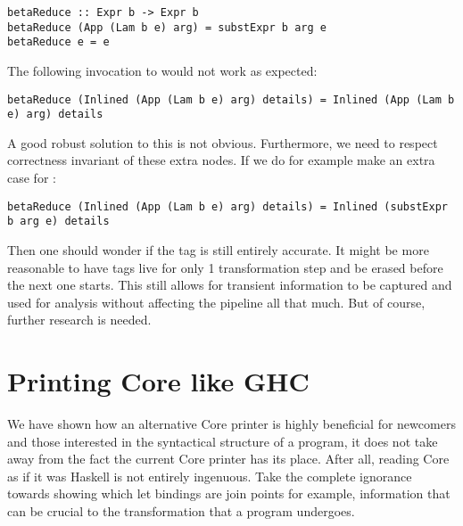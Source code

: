 \begin{listing}[H]
\begin{verbatim}
betaReduce :: Expr b -> Expr b
betaReduce (App (Lam b e) arg) = substExpr b arg e
betaReduce e = e
\end{verbatim}
\end{listing}

The following invocation to  would not work as expected:

\begin{listing}[H]
\begin{verbatim}
betaReduce (Inlined (App (Lam b e) arg) details) = Inlined (App (Lam b e) arg) details
\end{verbatim}
\end{listing}

A good robust solution to this is not obvious. Furthermore, we need to respect correctness invariant of these extra nodes. If we do for example make
an extra case for :

\begin{listing}[H]
\begin{verbatim}
betaReduce (Inlined (App (Lam b e) arg) details) = Inlined (substExpr b arg e) details
\end{verbatim}
\end{listing}

Then one should wonder if the  tag is still entirely accurate. It might be more reasonable to have tags live for only 1 transformation
step and be erased before the next one starts. This still allows for transient information to be captured and used for analysis without affecting
the pipeline all that much. But of course, further research is needed.


\section{Printing Core like GHC}
\label{section:discussion:printing}

We have shown how an alternative Core printer is highly beneficial for newcomers and those interested in the syntactical structure of a program,
it does not take away from the fact the current Core printer has its place. After all, reading Core as if it was Haskell is not entirely
ingenuous. Take the complete ignorance towards showing which let bindings are join points for example, information that can be crucial to
the transformation that a program undergoes.

